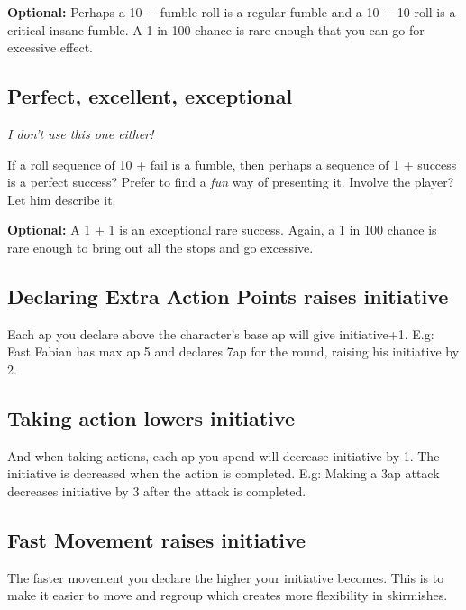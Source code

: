\textbf{Optional:} 
Perhaps a 10 + fumble roll is a regular fumble and a 10 + 10 roll is a critical insane fumble. A 1 in 100 chance is rare enough that you can go for excessive effect.



\subsection*{Perfect, excellent, exceptional}
\emph{I don't use this one either!}

If a roll sequence of 10 + fail is a fumble, then perhaps a sequence of 1 + success is a perfect success? Prefer to find a \emph{fun} way of presenting it. Involve the player? Let him describe it. 

\textbf{Optional:}
A 1 + 1 is an exceptional rare success. Again, a 1 in 100 chance is rare enough to bring out all the stops and go excessive.



\subsection*{Declaring Extra Action Points raises initiative}
Each ap you declare above the character's base ap will give initiative+1. 
E.g: Fast Fabian has max ap 5 and declares 7ap for the round, raising his initiative by 2.


\subsection*{Taking action lowers initiative}
And when taking actions, each ap you spend will decrease initiative by 1. The initiative is decreased when the action is completed.
E.g: Making a 3ap attack decreases initiative by 3 after the attack is completed.


\subsection*{Fast Movement raises initiative}
The faster movement you declare the higher your initiative becomes. This is to make it easier to move and regroup which creates more flexibility in skirmishes.

